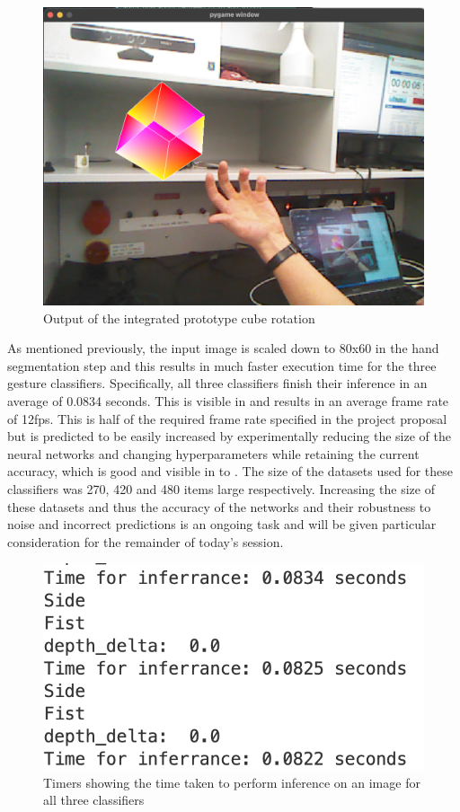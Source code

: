 \begin{figure}[h]
    \centering
    \includegraphics[width=0.7\linewidth]{figures/integrated_prototpe_1.png}
    \caption{Output of the integrated prototype cube rotation}
    \label{fig:integrated_prototpe_1}
\end{figure}

As mentioned previously, the input image is scaled down to 80x60 in the hand segmentation step and this results in much faster execution time for the three gesture classifiers. Specifically, all three classifiers finish their inference in an average of 0.0834 seconds. This is visible in  and results in an average frame rate of 12fps. This is half of the required frame rate specified in the project proposal but is predicted to be easily increased by experimentally reducing the size of the neural networks and changing hyperparameters while retaining the current accuracy, which is good and visible in  to . The size of the datasets used for these classifiers was 270, 420 and 480 items large respectively. Increasing the size of these datasets and thus the accuracy of the networks and their robustness to noise and incorrect predictions is an ongoing task and will be given particular consideration for the remainder of today's session.

\begin{figure}[h]
    \centering
    \includegraphics[width=0.4\linewidth]{figures/integrated_nn_speed.png}
    \caption{Timers showing the time taken to perform inference on an image for all three classifiers}
    \label{fig:integrated_nn_speed}
\end{figure}

